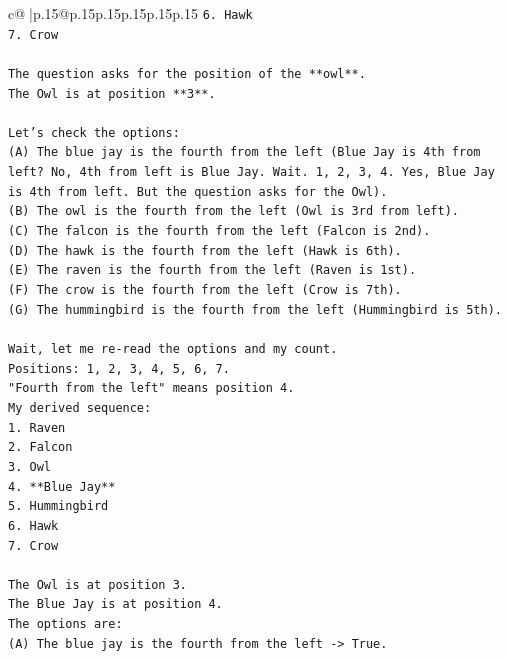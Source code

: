 \documentclass{article}
\begin{document}
{\begin{supertabular}{c@{$\;$}|p{.15\linewidth}@{}p{.15\linewidth}p{.15\linewidth}p{.15\linewidth}p{.15\linewidth}p{.15\linewidth}}
{{{\texttt{6. Hawk} \\
\texttt{7. Crow} \\
\\ 
\texttt{The question asks for the position of the **owl**.} \\
\texttt{The Owl is at position **3**.} \\
\\ 
\texttt{Let's check the options:} \\
\texttt{(A) The blue jay is the fourth from the left (Blue Jay is 4th from left? No, 4th from left is Blue Jay. Wait. 1, 2, 3, 4. Yes, Blue Jay is 4th from left. But the question asks for the Owl).} \\
\texttt{(B) The owl is the fourth from the left (Owl is 3rd from left).} \\
\texttt{(C) The falcon is the fourth from the left (Falcon is 2nd).} \\
\texttt{(D) The hawk is the fourth from the left (Hawk is 6th).} \\
\texttt{(E) The raven is the fourth from the left (Raven is 1st).} \\
\texttt{(F) The crow is the fourth from the left (Crow is 7th).} \\
\texttt{(G) The hummingbird is the fourth from the left (Hummingbird is 5th).} \\
\\ 
\texttt{Wait, let me re{-}read the options and my count.} \\
\texttt{Positions: 1, 2, 3, 4, 5, 6, 7.} \\
\texttt{"Fourth from the left" means position 4.} \\
\texttt{My derived sequence:} \\
\texttt{1. Raven} \\
\texttt{2. Falcon} \\
\texttt{3. Owl} \\
\texttt{4. **Blue Jay**} \\
\texttt{5. Hummingbird} \\
\texttt{6. Hawk} \\
\texttt{7. Crow} \\
\\ 
\texttt{The Owl is at position 3.} \\
\texttt{The Blue Jay is at position 4.} \\
\texttt{The options are:} \\
\texttt{(A) The blue jay is the fourth from the left {-}> True.} \\
}}}
\end{supertabular}}
\end{document}

